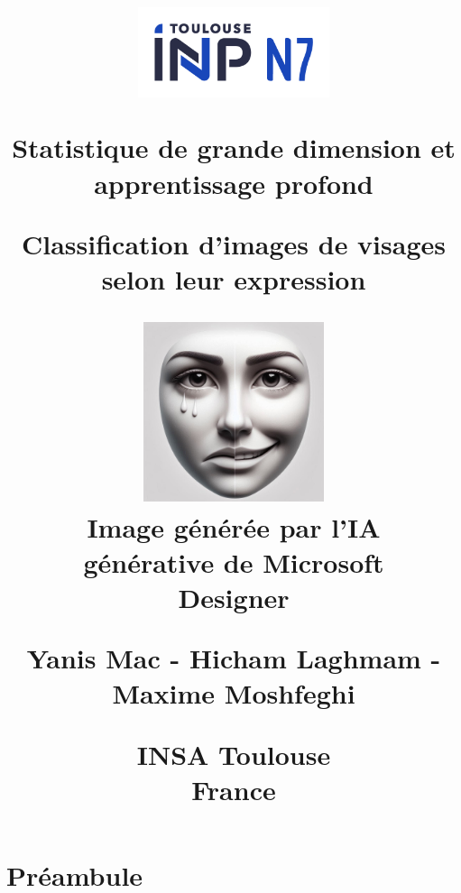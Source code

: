 \documentclass{report}
\title{
    \vspace*{-5cm} %

    \begin{figure}[H]
        \centering
        \includegraphics[width=0.5\textwidth]{Sources/Logos/Logo_ENSEEIHT.png}
        \label{fig:Logo_ENSEEIHT}
    \end{figure}
    
    \vspace*{0.5cm}
    
    
    \vspace{1.3cm}
    
    \Large{\textbf{Statistique de grande dimension et apprentissage profond}}
    
    \vspace{0.7cm}
    
    {\huge Classification d'images de visages selon leur expression}

    \vspace{1.0cm}

    \begin{figure}[H]
        \centering
        \includegraphics[width=0.47\textwidth]{Sources/Couverture/Cover_sad_happy.jpeg}
        \caption*{Image générée par l'IA générative de Microsoft Designer}
        \label{fig:Couverture}
    \end{figure}

    
    {\large \textbf{Yanis Mac - Hicham Laghmam - Maxime Moshfeghi}}
        
    \vspace{0.5cm}
    
    INSA Toulouse\\
    France
}
\begin{document}
\begin{titlepage}

\maketitle

\end{titlepage}


\tableofcontents %

\newpage

\chapter*{Préambule}
\end{document}
